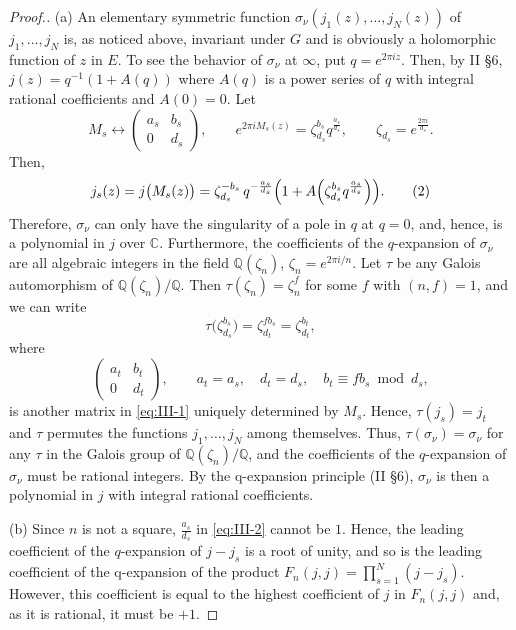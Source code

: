 \begin{proof}[Proof.]
(a) An elementary symmetric function
$\sigma_{\nu}(j_{1}(z),\ldots,j_{N}(z))$ of $j_{1},\ldots,j_{N}$ is, as
noticed above, invariant under $G$ and is obviously a holomorphic function
of $z$ in $E$. To see the behavior of $\sigma_{\nu}$ at $\infty$, put
$q=e^{2\pi iz}$. Then, by II §6,
$j(z)=q^{-1}(1+A(q))$ where $A(q)$ is a power series of $q$ with integral
rational coefficients and $A(0)=0$. Let
\[
M_{s}\leftrightarrow
\begin{pmatrix}a_{s}&b_{s}\\ 0&d_{s}\end{pmatrix},\qquad
e^{2\pi iM_{s}(z)}=\zeta_{d_{s}}^{b_{s}}q^{\frac{a_{s}}{d_{s}}},\qquad
\zeta_{d_{s}}=e^{\frac{2\pi i}{d_{s}}}.
\]
Then,
\[
j_{s}(z)=j\bigl(M_{s}(z)\bigr)
=\zeta_{d_{s}}^{-b_{s}}\,q^{-\frac{a_{s}}{d_{s}}}
\Bigl(1+A\Bigl(\zeta_{d_{s}}^{b_{s}}q^{\frac{a_{s}}{d_{s}}}\Bigr)\Bigr).
\tag{2}\label{eq:III-2}
\]
Therefore, $\sigma_{\nu}$ can only have the singularity of a pole in $q$
at $q=0$, and, hence, is a polynomial in $j$ over $\mathbb{C}$.
Furthermore, the coefficients of the $q$-expansion of $\sigma_{\nu}$ are
all algebraic integers in the field $\mathbb{Q}(\zeta_{n})$,
$\zeta_{n}=e^{2\pi i/n}$. Let $\tau$ be any Galois automorphism of
$\mathbb{Q}(\zeta_{n})/\mathbb{Q}$. Then $\tau(\zeta_{n})=\zeta_{n}^{f}$
for some $f$ with $(n,f)=1$, and we can write
\[
\tau\bigl(\zeta_{d_{s}}^{b_{s}}\bigr)=\zeta_{d_{t}}^{fb_{s}}
=\zeta_{d_{t}}^{b_{t}},
\]
where
\[
\begin{pmatrix}a_{t}&b_{t}\\ 0&d_{t}\end{pmatrix},\qquad
a_{t}=a_{s},\quad d_{t}=d_{s},\quad b_{t}\equiv fb_{s}\bmod d_{s},
\]
is another matrix in \eqref{eq:III-1} uniquely determined by $M_{s}$.
Hence, $\tau(j_{s})=j_{t}$ and $\tau$ permutes the functions
$j_{1},\ldots,j_{N}$ among themselves. Thus,
$\tau(\sigma_{\nu})=\sigma_{\nu}$ for any $\tau$ in the Galois group of
$\mathbb{Q}(\zeta_{n})/\mathbb{Q}$, and the coefficients of the
$q$-expansion of $\sigma_{\nu}$ must be rational integers. By the
q-expansion principle (II §6), $\sigma_{\nu}$ is then a polynomial in $j$
with integral rational coefficients.

(b) Since $n$ is not a square, $\frac{a_{s}}{d_{s}}$ in
\eqref{eq:III-2} cannot be $1$. Hence, the leading coefficient of the
$q$-expansion of $j-j_{s}$ is a root of unity, and so is the leading
coefficient of the q-expansion of the product
$F_{n}(j,j)=\prod_{s=1}^{N}(j-j_{s})$. However, this coefficient is equal
to the highest coefficient of $j$ in $F_{n}(j,j)$ and, as it is rational,
it must be $+1$.


\end{proof}
